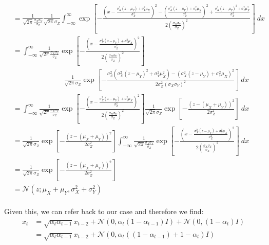 \documentclass[twoside]{article}
\numberwithin{equation}{section}
\numberwithin{figure}{section}
\begin{document}
{\begin{align*}
  &= \frac{1}{\sqrt{2 \pi} \frac{\sigma_X \sigma_Y}{\sigma_Z}} \frac{1}{\sqrt{2 \pi} \sigma_Z} \int_{-\infty}^{\infty} \exp\left[{-\frac{\left( x - \frac{\sigma_X^2 (z - \mu_Y) + \sigma_Y^2 \mu_X}{\sigma_Z^2}\right)^2 - \left( \frac{\sigma_X^2 (z - \mu_Y) + \sigma_Y^2 \mu_X}{\sigma_Z^2} \right)^2 + \frac{\sigma_X^2 (z - \mu_Y)^2 + \sigma_Y^2 \mu_X^2}{\sigma_Z^2}}{2 \left(\frac{\sigma_X \sigma_Y}{\sigma_Z}\right)^2}} \right] \: dx  \\[10pt]
  &= \int_{-\infty}^{\infty} \frac{1}{\sqrt{2 \pi} \frac{\sigma_X \sigma_Y}{\sigma_Z}} \exp\left[{-\frac{\left( x - \frac{\sigma_X^2 (z - \mu_Y) + \sigma_Y^2 \mu_X}{\sigma_Z^2}\right)^2}{2 \left(\frac{\sigma_X \sigma_Y}{\sigma_Z}\right)^2}} \right] \\[10pt]
  & \hspace{3cm} \frac{1}{\sqrt{2 \pi} \sigma_Z} \exp \left[ - \frac{\sigma_Z^2 \left( \sigma_X^2 (z - \mu_Y)^2 + \sigma_Y^2 \mu_X^2 \right) - \left( \sigma_X^2 (z - \mu_Y) + \sigma_Y^2 \mu_X \right)^2}{2 \sigma_Z^2 (\sigma_X \sigma_Y)^2} \right] \: dx  \\[10pt]
  &= \int_{-\infty}^{\infty} \frac{1}{\sqrt{2 \pi} \frac{\sigma_X \sigma_Y}{\sigma_Z}} \exp\left[{-\frac{\left( x - \frac{\sigma_X^2 (z - \mu_Y) + \sigma_Y^2 \mu_X}{\sigma_Z^2}\right)^2}{2 \left(\frac{\sigma_X \sigma_Y}{\sigma_Z}\right)^2}} \right] \frac{1}{\sqrt{2 \pi} \sigma_Z} \exp \left[ - \frac{(z - (\mu_X + \mu_Y))^2}{2 \sigma_Z^2} \right] \: dx  \\[10pt]
  &= \frac{1}{\sqrt{2 \pi} \sigma_Z} \exp \left[ - \frac{(z - (\mu_X + \mu_Y))^2}{2 \sigma_Z^2} \right] \int_{-\infty}^{\infty} \frac{1}{\sqrt{2 \pi} \frac{\sigma_X \sigma_Y}{\sigma_Z}} \exp\left[{-\frac{\left( x - \frac{\sigma_X^2 (z - \mu_Y) + \sigma_Y^2 \mu_X}{\sigma_Z^2}\right)^2}{2 \left(\frac{\sigma_X \sigma_Y}{\sigma_Z}\right)^2}} \right] \: dx  \\[10pt]
  &= \frac{1}{\sqrt{2 \pi} \sigma_Z} \exp \left[ - \frac{(z - (\mu_X + \mu_Y))^2}{2 \sigma_Z^2} \right] \\[10pt]
  &= \mathcal{N}\left(z; \mu_X + \mu_Y, \sigma_X^2 + \sigma_Y^2 \right)
\end{align*}
}
\\
Given this, we can refer back to our case and therefore we find:
\begin{align*}
  x_t &= \sqrt{\alpha_t \alpha_{t-1}} x_{t-2} + \mathcal{N}\left(0, \alpha_t\left(1 - \alpha_{t-1}\right)I \right) + \mathcal{N}\left(0, (1 - \alpha_t) I \right) \\
  &= \sqrt{\alpha_t \alpha_{t-1}} x_{t-2} + \mathcal{N}\left(0, \alpha_t \left((1 - \alpha_{t-1}) + 1 - \alpha_t \right)I \right) 
\end{align*}

\newpage
\printbibliography
\end{document}
